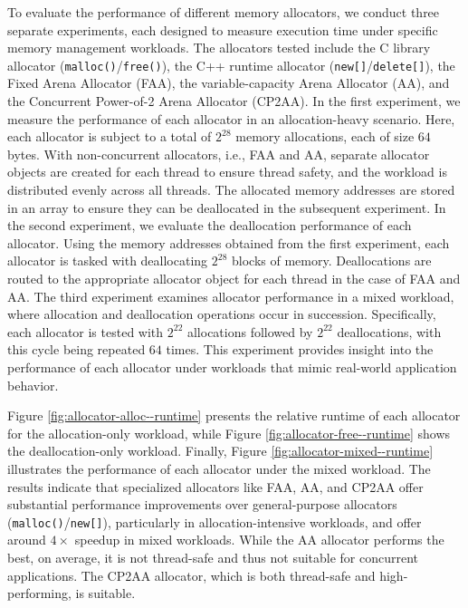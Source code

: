 

To evaluate the performance of different memory allocators, we conduct three separate experiments, each designed to measure execution time under specific memory management workloads. The allocators tested include the C library allocator (\texttt{malloc()}/\texttt{free()}), the C++ runtime allocator (\texttt{new[]}/\texttt{delete[]}), the Fixed Arena Allocator (FAA), the variable-capacity Arena Allocator (AA), and the Concurrent Power-of-2 Arena Allocator (CP2AA). In the first experiment, we measure the performance of each allocator in an allocation-heavy scenario. Here, each allocator is subject to a total of $2^{28}$ memory allocations, each of size $64$ bytes. With non-concurrent allocators, i.e., FAA and AA, separate allocator objects are created for each thread to ensure thread safety, and the workload is distributed evenly across all threads. The allocated memory addresses are stored in an array to ensure they can be deallocated in the subsequent experiment. In the second experiment, we evaluate the deallocation performance of each allocator. Using the memory addresses obtained from the first experiment, each allocator is tasked with deallocating $2^{28}$ blocks of memory. Deallocations are routed to the appropriate allocator object for each thread in the case of FAA and AA. The third experiment examines allocator performance in a mixed workload, where allocation and deallocation operations occur in succession. Specifically, each allocator is tested with $2^{22}$ allocations followed by $2^{22}$ deallocations, with this cycle being repeated $64$ times. This experiment provides insight into the performance of each allocator under workloads that mimic real-world application behavior.

Figure \ref{fig:allocator-alloc--runtime} presents the relative runtime of each allocator for the allocation-only workload, while Figure \ref{fig:allocator-free--runtime} shows the deallocation-only workload. Finally, Figure \ref{fig:allocator-mixed--runtime} illustrates the performance of each allocator under the mixed workload. The results indicate that specialized allocators like FAA, AA, and CP2AA offer substantial performance improvements over general-purpose allocators (\texttt{malloc()}/\texttt{new[]}), particularly in allocation-intensive workloads, and offer around $4\times$ speedup in mixed workloads. While the AA allocator performs the best, on average, it is not thread-safe and thus not suitable for concurrent applications. The CP2AA allocator, which is both thread-safe and high-performing, is suitable.



